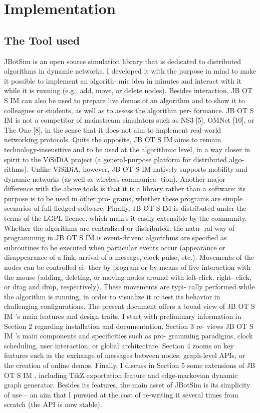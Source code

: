 \chapter{Implementation}

\section{The Tool used}
JBotSim is an open source simulation library that is dedicated
to distributed algorithms in dynamic networks. I developed it with
the purpose in mind to make it possible to implement an algorith-
mic idea in minutes and interact with it while it is running (e.g.,
add, move, or delete nodes). Besides interaction, JB OT S IM can
also be used to prepare live demos of an algorithm and to show it
to colleagues or students, as well as to assess the algorithm per-
formance. JB OT S IM is not a competitor of mainstream simulators
such as NS3 [5], OMNet [10], or The One [8], in the sense that it
does not aim to implement real-world networking protocols. Quite
the opposite, JB OT S IM aims to remain technology-insensitive and
to be used at the algorithmic level, in a way closer in spirit to the
ViSiDiA project (a general-purpose platform for distributed algo-
rithms). Unlike ViSiDiA, however, JB OT S IM natively supports
mobility and dynamic networks (as well as wireless communica-
tion). Another major difference with the above tools is that it is a
library rather than a software: its purpose is to be used in other pro-
grams, whether these programs are simple scenarios of full-fledged
software. Finally, JB OT S IM is distributed under the terms of the
LGPL licence, which makes it easily extensible by the community.
Whether the algorithms are centralized or distributed, the natu-
ral way of programming in JB OT S IM is event-driven: algorithms
are specified as subroutines to be executed when particular events
occur (appearance or disappearance of a link, arrival of a message,
clock pulse, etc.). Movements of the nodes can be controlled ei-
ther by program or by means of live interaction with the mouse
(adding, deleting, or moving nodes around with left-click, right-
click, or drag and drop, respectively). These movements are typi-
cally performed while the algorithm is running, in order to visualize
it or test its behavior in challenging configurations.
The present document offers a broad view of JB OT S IM ’s main
features and design traits. I start with preliminary information in
Section 2 regarding installation and documentation. Section 3 re-
views JB OT S IM ’s main components and specificities such as pro-
gramming paradigms, clock scheduling, user interaction, or global
architecture. Section 4 zooms on key features such as the exchange
of messages between nodes, graph-level APIs, or the creation of
online demos. Finally, I discuss in Section 5 some extensions of
JB OT S IM , including TikZ exportation feature and edge-markovian
dynamic graph generator.
Besides its features, the main asset of JBotSim is its simplicity
of use – an aim that I pursued at the cost of re-writing it several
times from scratch (the API is now stable).
